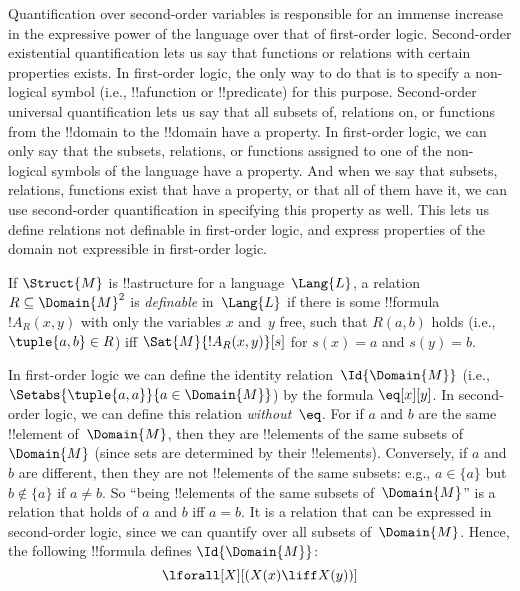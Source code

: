 \documentclass[../../../include/open-logic-section]{subfiles}
\begin{document}

\begin{explain}
Quantification over second-order variables is responsible for an
immense increase in the expressive power of the language over that of
first-order logic.  Second-order existential quantification lets us
say that functions or relations with certain properties exists. In
first-order logic, the only way to do that is to specify a non-logical
symbol (i.e., !!a{function} or !!{predicate}) for this
purpose. Second-order universal quantification lets us say that all
subsets of, relations on, or functions from the !!{domain} to the
!!{domain} have a property.  In first-order logic, we can only say
that the subsets, relations, or functions assigned to one of the
non-logical symbols of the language have a property.  And when we say
that subsets, relations, functions exist that have a property, or that
all of them have it, we can use second-order quantification in
specifying this property as well. This lets us define relations not
definable in first-order logic, and express properties of the domain
not expressible in first-order logic.
\end{explain}

\begin{defn}
If $\Struct{M}$ is !!a{structure} for a language~$\Lang{L}$, a
relation~$R \subseteq \Domain{M}^2$ is \emph{definable} in~$\Lang{L}$
if there is some !!{formula}~$!A_R(x, y)$ with only the variables $x$
and~$y$ free, such that $R(a, b)$ holds (i.e., $\tuple{a,b} \in R$)
iff $\Sat{M}{!A_R(x, y)}[s]$ for $s(x) = a$ and $s(y) = b$.
\end{defn}



\begin{ex}
In first-order logic we can define the identity
relation~$\Id{\Domain{M}}$ (i.e., $\Setabs{\tuple{a,a}}{a \in
  \Domain{M}}$) by the formula $\eq[x][y]$.  In
second-order logic, we can define this relation
\emph{without~$\eq$}. For if $a$ and $b$ are the same !!{element}
of~$\Domain{M}$, then they are !!{element}s of the same subsets
of~$\Domain{M}$ (since sets are determined by their
!!{element}s). Conversely, if $a$ and $b$ are different, then they are
not !!{element}s of the same subsets: e.g., $a \in \{a\}$ but $b
\notin \{a\}$ if $a \neq b$.  So ``being !!{element}s of the same
subsets of~$\Domain{M}$'' is a relation that holds of $a$ and $b$ iff
$a = b$. It is a relation that can be expressed in second-order logic,
since we can quantify over all subsets of~$\Domain{M}$. Hence, the
following !!{formula} defines $\Id{\Domain{M}}$:
\[
\lforall[X][(X(x) \liff X(y))]
\]
\end{ex}
\end{document}
